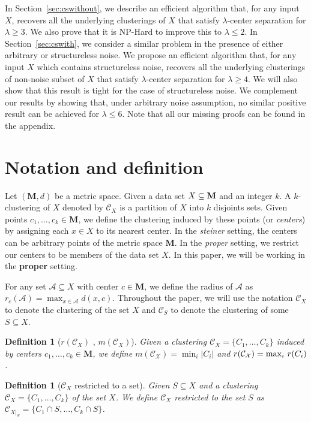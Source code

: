 \documentclass[12pt]{article}
\newtheorem{definition}[theorem]{Definition}
\newcommand{\mc}{\mathcal}
\newcommand{\mb}{\mathbf}
\begin{document}
In Section~\ref{sec:cswithout}, we describe an efficient algorithm that, for any input $X$, recovers all the underlying clusterings of $X$ that satisfy $\lambda$-center separation for $\lambda \geq 3$. We also prove that it is NP-Hard to improve this to $\lambda \leq 2$. In Section~\ref{sec:cswith}, we consider a similar problem in the presence of either arbitrary or structureless noise. We propose an efficient algorithm that, for any input $X$ which contains structureless noise, recovers all the underlying clusterings of non-noise subset of $X$ that satisfy $\lambda$-center separation for $\lambda \geq 4$. We will also show that this result is tight for the case of structureless noise. We complement our results by showing that, under arbitrary noise assumption, no similar positive result can be achieved for $\lambda \leq 6$. Note that all our missing proofs can be found in the appendix.

\section{Notation and definition}
\label{sec:Notation}
Let $(\mb M, d)$ be a metric space. Given a data set $X \subseteq \bf M$ and an integer $k$. A $k$-clustering of $X$ denoted by $\mc C_{X}$ is a partition of $X$ into $k$ disjoints sets. Given points $c_1, \ldots, c_k \in \mb M$, we define the clustering induced by these points (or {\it centers}) by assigning each $x \in X$ to its nearest center. In the {\it steiner} setting, the centers can be arbitrary points of the metric space $\mb M$. In the {\it proper} setting, we restrict our centers to be members of the data set $X$. In this paper, we will be working in the {\bf proper} setting.

For any set $\mc A\subseteq X$ with center $c\in \mb M$, we define the radius of $\mc A$ as $r_c(\mc A) = \max_{x \in \mc A} d(x, c)$. Throughout the paper, we will use the notation $\mc C_{X}$ to denote the clustering of the set $X$ and $\mc C_{S}$ to denote the clustering of some $S\subseteq X$. 

\begin{definition}[$r(\mc C_{X})$ , $m(\mc C_{X})$] Given a clustering $\mc C_{X} = \{C_1, \ldots, C_k\}$ induced by centers $c_1, \ldots, c_k \in \mb M$, we define $m(\mc{C}_{\mc{X}}) = \min_i |C_i|$ and $r(\mc{C}_{\mc{X}}) = \max_i \thinspace r(C_i)$.
\end{definition}

\begin{definition}[$\mc C_{X}$ restricted to a set] Given $S \subseteq X$ and a clustering $\mc C_{X} = \{C_1, \ldots, C_k\}$ of the set $X$. We define $\mc C_{X}$ restricted to the set $S$ as $\mc C_{{X}|_{S}} = \{C_1 \cap S, \ldots, C_k \cap S\}$. 
\end{definition}
\end{document}
